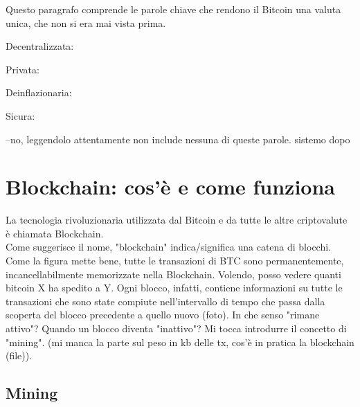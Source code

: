 \documentclass {article}
\begin{document}
Questo paragrafo comprende le parole chiave che rendono il Bitcoin una valuta unica, che non si era mai vista prima.

Decentralizzata:

Privata:

Deinflazionaria:

Sicura:

--no, leggendolo attentamente non include nessuna di queste parole. sistemo dopo


\section {Blockchain: cos'è e come funziona}


La tecnologia rivoluzionaria utilizzata dal Bitcoin e da tutte le altre criptovalute è chiamata Blockchain.\\
Come suggerisce il nome, "blockchain" indica/significa una catena di blocchi.
Come la figura mette bene, tutte le transazioni di BTC sono permanentemente, incancellabilmente memorizzate nella Blockchain.
Volendo, posso vedere quanti bitcoin X ha spedito a Y.
Ogni blocco, infatti, contiene informazioni su tutte le transazioni che sono state compiute nell'intervallo di tempo che passa dalla scoperta del blocco precedente a quello nuovo (foto).
In che senso "rimane attivo"? Quando un blocco diventa "inattivo"?
Mi tocca introdurre il concetto di "mining". (mi manca la parte sul peso in kb delle tx, cos'è in pratica la blockchain (file)).


\subsection {Mining}
\end{document}
